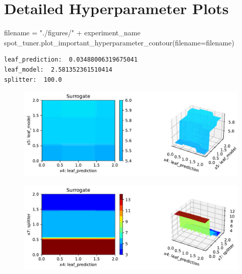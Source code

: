 \documentclass[
  letterpaper,
  DIV=11,
  numbers=noendperiod]{scrreprt}
\newenvironment{Shaded}{\begin{snugshade}}{\end{snugshade}}
\newcommand{\NormalTok}[1]{\textcolor[rgb]{0.00,0.23,0.31}{#1}}
\newcommand{\OperatorTok}[1]{\textcolor[rgb]{0.37,0.37,0.37}{#1}}
\newcommand{\StringTok}[1]{\textcolor[rgb]{0.13,0.47,0.30}{#1}}
\begin{document}
\hypertarget{detailed-hyperparameter-plots-1}{%
\section{Detailed Hyperparameter
Plots}\label{detailed-hyperparameter-plots-1}}

\begin{Shaded}
\begin{Highlighting}[]
\NormalTok{filename }\OperatorTok{=} \StringTok{"./figures/"} \OperatorTok{+}\NormalTok{ experiment\_name}
\NormalTok{spot\_tuner.plot\_important\_hyperparameter\_contour(filename}\OperatorTok{=}\NormalTok{filename)}
\end{Highlighting}
\end{Shaded}

\begin{verbatim}
leaf_prediction:  0.03488006319675041
leaf_model:  2.581352361510414
splitter:  100.0
\end{verbatim}

\begin{figure}[H]

{\centering \includegraphics{13_spot_hpt_river_files/figure-pdf/cell-44-output-2.pdf}

}

\end{figure}

\begin{figure}[H]

{\centering \includegraphics{13_spot_hpt_river_files/figure-pdf/cell-44-output-3.pdf}

}

\end{figure}
\end{document}
